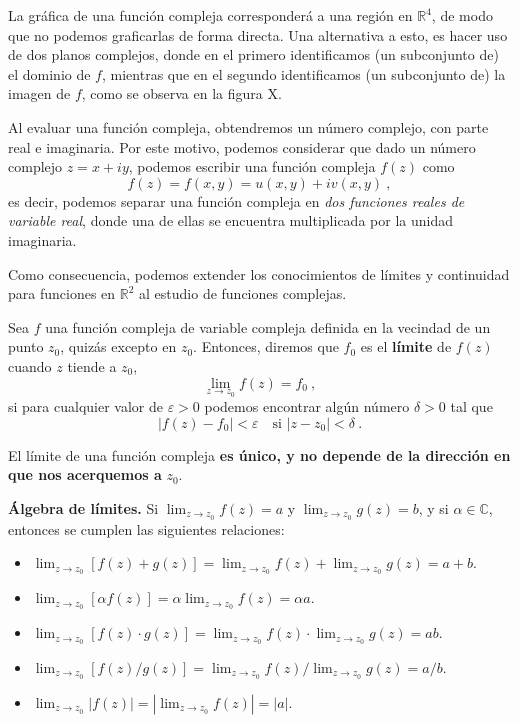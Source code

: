 La gráfica de una función compleja corresponderá a una región en $\mathbb{R}^4$, de modo que no podemos graficarlas de forma directa. Una alternativa a esto, es hacer uso de dos planos complejos, donde en el primero identificamos (un subconjunto de) el dominio de $f$, mientras que en el segundo identificamos (un subconjunto de) la imagen de $f$, como se observa en la figura X.

Al evaluar una función compleja, obtendremos un número complejo, con parte real e imaginaria. Por este motivo, podemos considerar que dado un número complejo $z = x+iy$, podemos escribir una función compleja $f(z)$ como
\begin{equation*}
    f(z) = f(x,y) = u(x,y) + i v(x,y) \ ,
\end{equation*}
es decir, podemos separar una función compleja en \emph{dos funciones reales de variable real}, donde una de ellas se encuentra multiplicada por la unidad imaginaria.

Como consecuencia, podemos extender los conocimientos de límites y continuidad para funciones en $\mathbb{R}^2$ al estudio de funciones complejas.

\begin{defi} 
    Sea $f$ una función compleja de variable compleja definida en la vecindad de un punto $z_0$, quizás excepto en $z_0$. Entonces, diremos que $f_0$ es el \textbf{límite} de $f(z)$ cuando $z$ tiende a $z_0$,
    \begin{equation*}
        \lim_{z \to z_0} f(z) = f_0 \ ,
    \end{equation*}
    si para cualquier valor de $\varepsilon > 0$ podemos encontrar algún número $\delta > 0$ tal que 
    \begin{equation*}
        |f(z) - f_0| < \varepsilon \quad \text{si } |z - z_0| < \delta \ . 
    \end{equation*}

    El límite de una función compleja \textbf{es único, y no depende de la dirección en que nos acerquemos a } $z_0$.
\end{defi}

\begin{teorema}{\textbf{Álgebra de límites.}}
    Si $\lim_{z \to z_0} f(z) = a$ y $\lim_{z \to z_0} g(z) = b$, y si $\alpha \in \mathbb{C}$, entonces se cumplen las siguientes relaciones:
    \begin{itemize}
        \item $\lim_{z \to z_0} [f(z) + g(z)] = \lim_{z \to z_0} f(z) + \lim_{z \to z_0} g(z) = a + b$.
        \item $\lim_{z \to z_0} [\alpha f(z)] = \alpha \lim_{z \to z_0} f(z) = \alpha a$.
        \item $\lim_{z \to z_0} [f(z) \cdot g(z)] = \lim_{z \to z_0} f(z) \cdot \lim_{z \to z_0} g(z) = ab$.
        \item $\lim_{z \to z_0} [f(z) / g(z)] = \lim_{z \to z_0} f(z) / \lim_{z \to z_0} g(z) = a / b$.
        \item $\lim_{z \to z_0} |f(z)| = \left| \lim_{z \to z_0} f(z) \right| = |a|$.
    \end{itemize}
\end{teorema}

